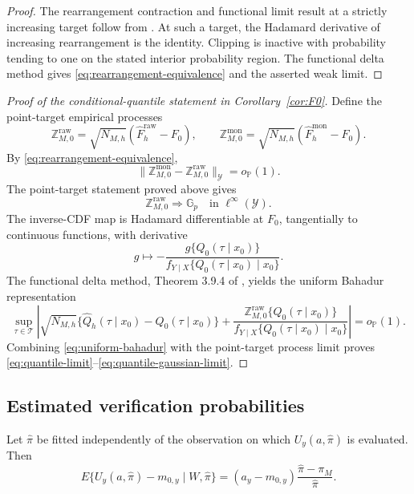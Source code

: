 \begin{proof}
The rearrangement contraction and functional limit result at a strictly increasing target follow from \citet{ChernozhukovEtAl2010}. At such a target, the Hadamard derivative of increasing rearrangement is the identity. Clipping is inactive with probability tending to one on the stated interior probability region. The functional delta method gives \eqref{eq:rearrangement-equivalence} and the asserted weak limit.
\end{proof}

\begin{proof}[Proof of the conditional-quantile statement in Corollary~\ref{cor:F0}]
Define the point-target empirical processes
\[
\mathbb Z_{M,0}^{\mathrm{raw}}
=
\sqrt{N_{M,h}}(\widehat F_h^{\mathrm{raw}}-F_0),
\qquad
\mathbb Z_{M,0}^{\mathrm{mon}}
=
\sqrt{N_{M,h}}(\widehat F_h^{\mathrm{mon}}-F_0).
\]
By \eqref{eq:rearrangement-equivalence},
\[
\|\mathbb Z_{M,0}^{\mathrm{mon}}
 -\mathbb Z_{M,0}^{\mathrm{raw}}\|_{\mathcal Y}
=o_{\mathbb P}(1).
\]
The point-target statement proved above gives
\[
\mathbb Z_{M,0}^{\mathrm{raw}}
\Rightarrow\mathbb G_p
\quad\text{in }\ell^\infty(\mathcal Y).
\]
The inverse-CDF map is Hadamard differentiable at \(F_0\), tangentially to continuous functions, with derivative
\[
g\mapsto
-
\frac{g\{Q_0(\tau\mid x_0)\}}
{f_{Y\mid X}\{Q_0(\tau\mid x_0)\mid x_0\}}.
\]
The functional delta method, Theorem 3.9.4 of \citet{VanderVaartWellner1996}, yields the uniform Bahadur representation
\begin{equation}
\sup_{\tau\in\mathcal T}
\left|
\sqrt{N_{M,h}}\{\widehat Q_h(\tau\mid x_0)-Q_0(\tau\mid x_0)\}
+
\frac{\mathbb Z_{M,0}^{\mathrm{raw}}\{Q_0(\tau\mid x_0)\}}
{f_{Y\mid X}\{Q_0(\tau\mid x_0)\mid x_0\}}
\right|
=o_{\mathbb P}(1).
\label{eq:uniform-bahadur}
\end{equation}
Combining \eqref{eq:uniform-bahadur} with the point-target process limit proves \eqref{eq:quantile-limit}--\eqref{eq:quantile-gaussian-limit}.
\end{proof}

\subsection{Estimated verification probabilities}

\begin{lemma}
\label{lem:propensity-drift}
Let \(\widehat\pi\) be fitted independently of the observation on which \(U_y(a,\widehat\pi)\) is evaluated. Then
\begin{equation}
E\{U_y(a,\widehat\pi)-m_{0,y}\mid W,\widehat\pi\}
=
(a_y-m_{0,y})
\frac{\widehat\pi-\pi_M}{\widehat\pi}.
\label{eq:supp-pi-drift}
\end{equation}
\end{lemma}

